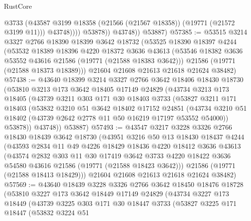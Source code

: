 \begin{lexlean}{RustCore}
\begin{coremodule}
                      @3733
                      (@43587 @3199 @18358 (@21566 (@21567 @18358)) (@19771 (@21572 @3199 @11)))
                      @43748))))
              @53878))
          @43748))
      @53887)
@57385 := @53515
    @3214
    @3327
    @2766
    @18390
    @18399
    @3642
    @18732
    (@53525
      @18390
      @18397
      @4244
      (@53532
        @18389
        @18396
        @4220
        @18372
        @3636
        @43613
        (@53546 @18382 @3636 @53552 @43616 @21586 (@19771 (@21588 @18383 @3642)))
        @21586
        (@19771 (@21588 @18373 @18389)))
      @21604
      @21608
      @21613
      @21618
      @21624
      @38482)
@57438 := @43640
    @18399
    @3214
    @3327
    @2766
    @3642
    @18406
    @18430
    @18730
    (@53810
      @3213
      @173
      @3642
      @18405
      @17149
      @24829
      (@43734
        @3213
        @173
        @18405
        (@43739
          @3211
          @303
          @171
          @30
          @18403
          @3733
          (@53827
            @3211
            @171
            @18403
            (@53832
              @3210
              @51
              @3642
              @18402
              @17152
              @24851
              (@43734 @3210 @51 @18402 (@43739 @2642 @2778 @11 @50 @16219 @17197 @53552 @54000))
              @53878))
          @43748))
      @53887)
@57493 := @43547
    @3217
    @3228
    @3326
    @2766
    @18430
    @18439
    @3642
    @18730
    (@43951
      @3216
      @50
      @13
      @18430
      @18437
      @4244
      (@43593
        @2834
        @11
        @49
        @4226
        @18429
        @18436
        @4220
        @18412
        @3636
        @43613
        (@43574
          @2832
          @303
          @11
          @30
          @17419
          @3642
          @3733
          @4220
          @18422
          @3636
          @54580
          @43616
          @21586
          (@19771 (@21588 @18423 @3642)))
        @21586
        (@19771 (@21588 @18413 @18429)))
      @21604
      @21608
      @21613
      @21618
      @21624
      @38482)
@57569 := @43640
    @18439
    @3228
    @3326
    @2766
    @3642
    @18450
    @18476
    @18728
    (@53810
      @3227
      @173
      @3642
      @18449
      @17149
      @24829
      (@43734
        @3227
        @173
        @18449
        (@43739
          @3225
          @303
          @171
          @30
          @18447
          @3733
          (@53827
            @3225
            @171
            @18447
            (@53832
              @3224
              @51

\end{coremodule}
\end{lexlean}
